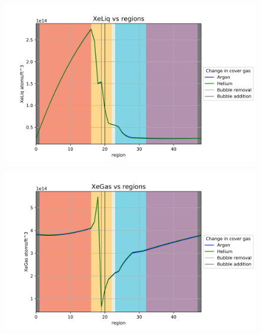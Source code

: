 \begin{figure}[p] 
\centering
\begin{minipage}{.5\textwidth}
  \centering
  \includegraphics[width=1.0\linewidth]{images/CoverGasXeLiq.png}
  \label{fig:CoverGasXeLiq}
\end{minipage}%
\begin{minipage}{.5\textwidth}
  \centering
  \includegraphics[width=1.0\linewidth]{images/CoverGasXeGas.png}
  \label{fig:CoverGasXeGas}
\end{minipage}
\end{figure}